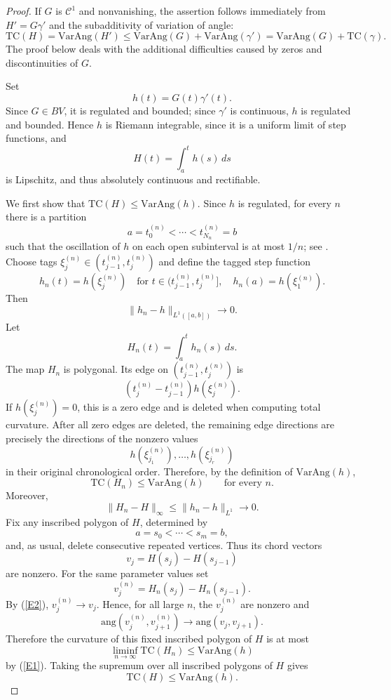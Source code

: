 \documentclass[10pt,a4paper]{amsart}
\newcommand{\ang}{\mathrm{ang}}
\newcommand{\T}{\mathrm{TC}}
\newcommand{\VA}{\mathrm{VarAng}}
\newcommand{\cC}{\mathcal{C}}
\numberwithin{equation}{section}
\begin{document}
\begin{proof} If $G$ is $\cC^1$ and nonvanishing, the assertion follows immediately from $H'=G\gamma'$ and the subadditivity of variation of angle:
\[\T(H)=\VA(H')\le \VA(G)+\VA(\gamma')=\VA(G)+\T(\gamma).\]
The proof below deals with the additional difficulties caused by zeros
and discontinuities of $G$.

Set
\[
h(t)=G(t)\gamma'(t).
\]
Since $G\in BV$, it is regulated and bounded; since $\gamma'$ is continuous, $h$ is regulated and bounded. Hence $h$ is Riemann integrable, since it is a uniform limit of step functions, and
\[H(t)=\int_a^t h(s)\,ds\]
is Lipschitz, and thus absolutely continuous and rectifiable.

We first show that  $\T(H)\le \VA(h)$. Since $h$ is regulated, for every $n$ there is a partition
\[
a=t_0^{(n)}<\cdots<t_{N_n}^{(n)}=b
\]
such that the oscillation of $h$ on each open subinterval is at most $1/n$; see \cite{F}. Choose tags
$\xi_j^{(n)}\in(t_{j-1}^{(n)},t_j^{(n)})$ and define the tagged step function
\[h_n(t)=h(\xi_j^{(n)})
\quad\text{for }t\in(t_{j-1}^{(n)},t_j^{(n)}],\quad h_n(a)=h(\xi_1^{(n)}).\]
Then
\[\|h_n-h\|_{L^1([a,b])}\longrightarrow 0.\]
Let
\[
H_n(t)=\int_a^t h_n(s)\,ds.
\]
The map $H_n$ is polygonal. Its edge on $(t_{j-1}^{(n)},t_j^{(n)})$ is
\[
\left(t_j^{(n)}-t_{j-1}^{(n)}\right)h(\xi_j^{(n)}).
\]
If $h(\xi_j^{(n)})=0$, this is a zero edge and is deleted when computing total curvature. After all zero edges are deleted, the remaining edge directions are precisely the directions of the nonzero values
\[
h(\xi_{j_1}^{(n)}),\ldots,h(\xi_{j_r}^{(n)})
\]
in their original chronological order. Therefore, by the definition of $\VA(h)$,
\begin{equation}\label{E1}\T(H_n)\le \VA(h)
\qquad\text{for every }n.\end{equation}
Moreover,
\begin{equation}\label{E2}\|H_n-H\|_\infty \le \|h_n-h\|_{L^1}\longrightarrow0.\end{equation}
Fix any inscribed polygon of $H$, determined by
\[a= s_0<\cdots<s_m= b,\] and, as usual, delete consecutive repeated vertices. Thus its chord vectors
\[v_j=H(s_j)-H(s_{j-1})\]
are nonzero. For the same parameter values set
\[v_j^{(n)}=H_n(s_j)-H_n(s_{j-1}).\]
By (\ref{E2}), $v_j^{(n)}\to v_j$. Hence, for all large $n$, the $v_j^{(n)}$ are nonzero and
\[\ang\left(v_j^{(n)},v_{j+1}^{(n)}\right)\longrightarrow \ang(v_j,v_{j+1}).
\]
Therefore the curvature of this fixed inscribed polygon of $H$ is at most
\[\liminf_{n\to\infty}\T(H_n)\le \VA(h)\]
by (\ref{E1}). Taking the supremum over all inscribed polygons of $H$ gives
\[\T(H)\le \VA(h).\]


\end{proof}
\end{document}
